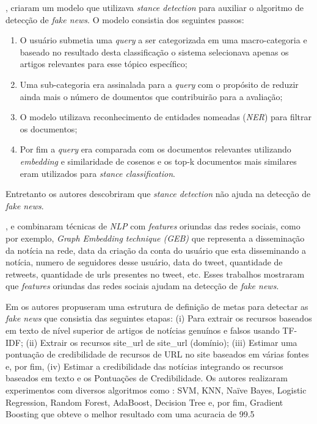 \citet{DeMagistris2022},  criaram um modelo que utilizava \textit{stance detection} para auxiliar o algoritmo de detecção de \textit{fake news}. 
O modelo consistia dos seguintes passos: 
\begin{enumerate}
    \item  O usuário submetia uma \textit{query} a ser categorizada em uma macro-categoria e baseado no resultado desta classificação o sistema selecionava apenas os artigos relevantes para esse tópico específico; 
    \item Uma sub-categoria era assinalada para a \textit{query} com o propósito de reduzir ainda mais o número de doumentos que contribuirão para a avaliação; 
    \item O modelo utilizava reconhecimento de entidades nomeadas (\textit{NER}) para filtrar os documentos; 
    \item Por fim a \textit{query} era comparada com os documentos relevantes utilizando \textit{embedding} e similaridade de cosenos e os top-k documentos mais similares eram utilizados para \textit{stance classification}. 
    \end{enumerate}
    Entretanto os autores descobriram que \textit{stance detection} não ajuda na detecção de \textit{fake news}.


\citet{Wu2021530}, e \citet{Mouratidis20211} combinaram técnicas de \textit{NLP} com \textit{features} oriundas das redes sociais, como por exemplo, \textit{Graph Embedding technique (GEB)} que representa a disseminação da notícia na rede, data da criação da conta do usuário que esta disseminando a notícia, numero de seguidores desse usuário, data do tweet, quantidade de retweets, quantidade de urls presentes no tweet, etc. 
Esses trabalhos mostraram que \textit{features} oriundas das redes sociais ajudam na detecção de \textit{fake news}.

Em \citet{SelvaBirunda2021406} os autores propuseram uma estrutura de definição de metas para detectar as \textit{fake news} que consistia das seguintes etapas: (i) Para extrair os recursos baseados em texto de nível superior de artigos de notícias genuínos e falsos usando TF-IDF; (ii) Extrair os recursos site\_url de site\_url (domínio); (iii) Estimar uma pontuação de credibilidade de recursos de URL no site baseados em várias fontes e, por fim, (iv) Estimar a credibilidade das notícias integrando os recursos baseados em texto e os Pontuações de Credibilidade. Os autores realizaram experimentos com diversos algoritmos como : SVM, KNN, Naïve Bayes, Logistic Regression, Random Forest, AdaBoost, Decision Tree e, por fim, Gradient Boosting que obteve o melhor resultado com uma acuracia de 99.5%

